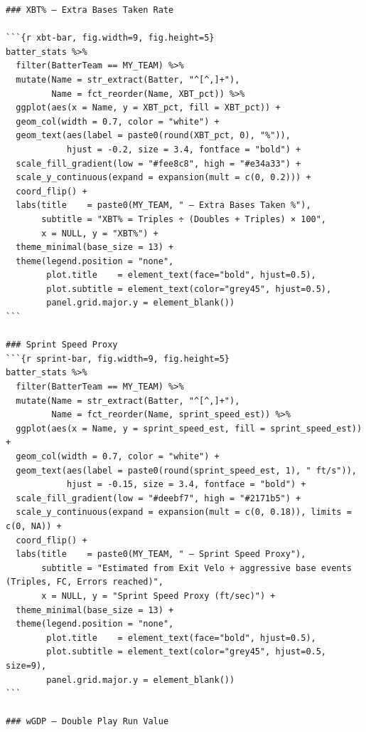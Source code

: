 \documentclass[
]{article}
\begin{document}
\begin{verbatim}
### XBT% — Extra Bases Taken Rate

```{r xbt-bar, fig.width=9, fig.height=5}
batter_stats %>%
  filter(BatterTeam == MY_TEAM) %>%
  mutate(Name = str_extract(Batter, "^[^,]+"),
         Name = fct_reorder(Name, XBT_pct)) %>%
  ggplot(aes(x = Name, y = XBT_pct, fill = XBT_pct)) +
  geom_col(width = 0.7, color = "white") +
  geom_text(aes(label = paste0(round(XBT_pct, 0), "%")),
            hjust = -0.2, size = 3.4, fontface = "bold") +
  scale_fill_gradient(low = "#fee8c8", high = "#e34a33") +
  scale_y_continuous(expand = expansion(mult = c(0, 0.2))) +
  coord_flip() +
  labs(title    = paste0(MY_TEAM, " — Extra Bases Taken %"),
       subtitle = "XBT% = Triples ÷ (Doubles + Triples) × 100",
       x = NULL, y = "XBT%") +
  theme_minimal(base_size = 13) +
  theme(legend.position = "none",
        plot.title    = element_text(face="bold", hjust=0.5),
        plot.subtitle = element_text(color="grey45", hjust=0.5),
        panel.grid.major.y = element_blank())
```

### Sprint Speed Proxy
```{r sprint-bar, fig.width=9, fig.height=5}
batter_stats %>%
  filter(BatterTeam == MY_TEAM) %>%
  mutate(Name = str_extract(Batter, "^[^,]+"),
         Name = fct_reorder(Name, sprint_speed_est)) %>%
  ggplot(aes(x = Name, y = sprint_speed_est, fill = sprint_speed_est)) +
  geom_col(width = 0.7, color = "white") +
  geom_text(aes(label = paste0(round(sprint_speed_est, 1), " ft/s")),
            hjust = -0.15, size = 3.4, fontface = "bold") +
  scale_fill_gradient(low = "#deebf7", high = "#2171b5") +
  scale_y_continuous(expand = expansion(mult = c(0, 0.18)), limits = c(0, NA)) +
  coord_flip() +
  labs(title    = paste0(MY_TEAM, " — Sprint Speed Proxy"),
       subtitle = "Estimated from Exit Velo + aggressive base events (Triples, FC, Errors reached)",
       x = NULL, y = "Sprint Speed Proxy (ft/sec)") +
  theme_minimal(base_size = 13) +
  theme(legend.position = "none",
        plot.title    = element_text(face="bold", hjust=0.5),
        plot.subtitle = element_text(color="grey45", hjust=0.5, size=9),
        panel.grid.major.y = element_blank())
```

### wGDP — Double Play Run Value


\end{verbatim}
\end{document}
